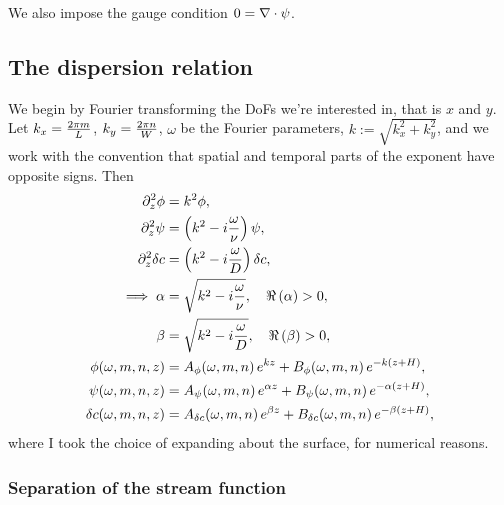 \documentclass[reqno]{amsart}
\numberwithin{equation}{section}
\numberwithin{figure}{section}
\begin{document}
We also impose the gauge condition $0=\nabla\cdot\psi$.

\subsection{The dispersion relation}

We begin by Fourier transforming the DoFs we're interested in, that is $x$ and $y$. Let $k_{x}=\frac{2\pi m}{L}$, $k_{y}=\frac{2\pi n}{W}$, $\omega$ be the Fourier parameters, $k:=\sqrt{k_{x}^{2}+k_{y}^{2}}$, and we work with the convention that spatial and temporal parts of the exponent have opposite signs. Then
\begin{align*}
\partial_{z}^{2}\vPotential       &= k^{2}\vPotential, \\
\partial_{z}^{2}\vStream          &= \left(k^{2}-i\frac{\omega}{\kinematicViscousity}\right)\vStream, \\
\partial_{z}^{2}\delta\sBulkCo    &= \left(k^{2}-i\frac{\omega}{D}\right)\delta\sBulkCo, \\
\implies \alpha
  &= \sqrt{k^{2}-i\frac{\omega}{\kinematicViscousity}},\quad \Re\left(\alpha\right)>0, \\
\beta
  &= \sqrt{k^{2}-i\frac{\omega}{D}},\quad \Re\left(\beta\right)>0, \\
\vPotential\!\left(\omega,m,n,z\right)
  &= A_{\vPotential}\!\left(\omega,m,n\right)e^{kz}+B_{\vPotential}\!\left(\omega,m,n\right)e^{-k\left(z+\aHeight\right)}, \\
\vStream\!\left(\omega,m,n,z\right)
  &= A_{\vStream}\!\left(\omega,m,n\right)e^{\alpha z}+B_{\vStream}\!\left(\omega,m,n\right)e^{-\alpha\left(z+\aHeight\right)}, \\
\delta\sBulkCo\!\left(\omega,m,n,z\right)
  &= A_{\delta\sBulkCo}\!\left(\omega,m,n\right)e^{\beta z}+B_{\delta\sBulkCo}\!\left(\omega,m,n\right)e^{-\beta\left(z+\aHeight\right)},
\end{align*}
where I took the choice of expanding about the surface, for numerical reasons.

\subsubsection{Separation of the stream function}
\end{document}
